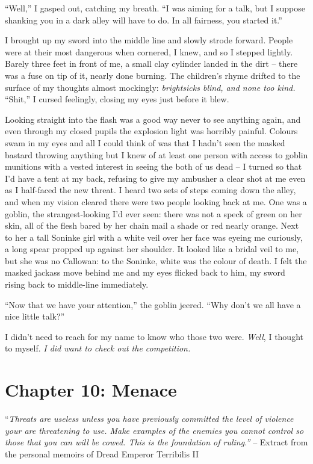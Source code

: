 \documentclass[12pt, openany]{book}
\begin{document}
“Well,” I gasped out, catching my breath. “I was aiming for a talk, but I suppose shanking you in a dark alley will have to do. In all fairness, you started it.”

I brought up my sword into the middle line and slowly strode forward.\textit{ }People were at their most dangerous when cornered, I knew, and so I stepped lightly. Barely three feet in front of me, a small clay cylinder landed in the dirt – there was a fuse on tip of it, nearly done burning. The children’s rhyme drifted to the surface of my thoughts almost mockingly: \textit{brightsicks blind, and none too kind.} “Shit,” I cursed feelingly, closing my eyes just before it blew. 

Looking straight into the flash was a good way never to see anything again, and even through my closed pupils the explosion light was horribly painful. Colours swam in my eyes and all I could think of was that I hadn’t seen the masked bastard throwing anything but I knew of at least one person with access to goblin munitions with a vested interest in seeing the both of us dead – I turned so that I’d have a tent at my back, refusing to give my ambusher a clear shot at me even as I half-faced the new threat. I heard two sets of steps coming down the alley, and when my vision cleared there were two people looking back at me. One was a goblin, the strangest-looking I’d ever seen: there was not a speck of green on her skin, all of the flesh bared by her chain mail a shade or red nearly orange. Next to her a tall Soninke girl with a white veil over her face was eyeing me curiously, a long spear propped up against her shoulder. It looked like a bridal veil to me, but she was no Callowan: to the Soninke, white was the colour of death. I felt the masked jackass move behind me and my eyes flicked back to him, my sword rising back to middle-line immediately.

“Now that we have your attention,” the goblin jeered. “Why don’t we all have a nice little talk?”

I didn’t need to reach for my name to know who those two were. \textit{Well}, I thought to myself.\textit{ I did want to check out the competition.}
\clearpage
\chapter{Chapter 10: Menace}

“\textit{Threats are useless unless you have previously committed the level of violence your are threatening to use. Make examples of the enemies you cannot control so those that you can will be cowed. This is the foundation of ruling.”}
– Extract from the personal memoirs of Dread Emperor Terribilis II
\end{document}
